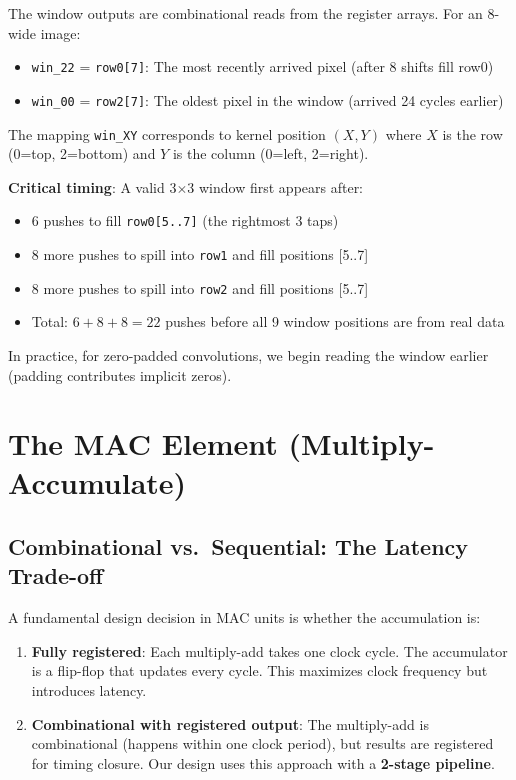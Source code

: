 \documentclass[11pt,a4paper]{report}
\newcommand{\signal}[1]{\texttt{\color{datacolor}#1}}
\newcommand{\regname}[1]{\texttt{\color{memorycolor}#1}}
\begin{document}
The window outputs are combinational reads from the register arrays. For an 8-wide image:

\begin{itemize}[leftmargin=2em]
    \item \signal{win\_22} = \regname{row0[7]}: The most recently arrived pixel (after 8 shifts fill row0)
    \item \signal{win\_00} = \regname{row2[7]}: The oldest pixel in the window (arrived 24 cycles earlier)
\end{itemize}

The mapping \signal{win\_XY} corresponds to kernel position $(X, Y)$ where $X$ is the row (0=top, 2=bottom) and $Y$ is the column (0=left, 2=right).

\textbf{Critical timing}: A valid 3$\times$3 window first appears after:
\begin{itemize}[leftmargin=2em]
    \item 6 pushes to fill \regname{row0[5..7]} (the rightmost 3 taps)
    \item 8 more pushes to spill into \regname{row1} and fill positions [5..7]
    \item 8 more pushes to spill into \regname{row2} and fill positions [5..7]
    \item Total: $6 + 8 + 8 = 22$ pushes before all 9 window positions are from real data
\end{itemize}

In practice, for zero-padded convolutions, we begin reading the window earlier (padding contributes implicit zeros).


\section{The MAC Element (Multiply-Accumulate)}

\subsection{Combinational vs.\ Sequential: The Latency Trade-off}

A fundamental design decision in MAC units is whether the accumulation is:

\begin{enumerate}[leftmargin=2em]
    \item \textbf{Fully registered}: Each multiply-add takes one clock cycle. The accumulator is a flip-flop that updates every cycle. This maximizes clock frequency but introduces latency.
    
    \item \textbf{Combinational with registered output}: The multiply-add is combinational (happens within one clock period), but results are registered for timing closure. Our design uses this approach with a \textbf{2-stage pipeline}.
\end{enumerate}
\end{document}
